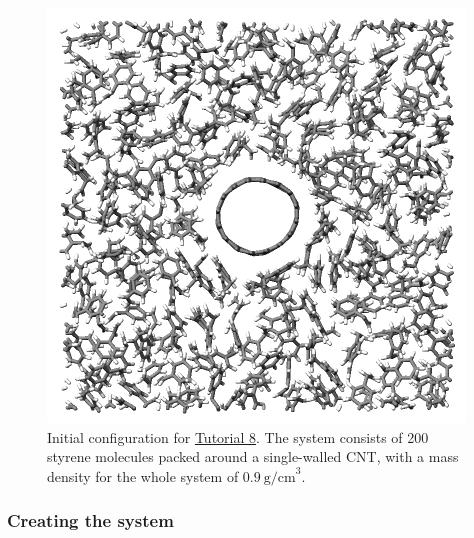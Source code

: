\documentclass[9pt,tutorial]{livecoms}
\begin{document}
\begin{figure}
\centering
\includegraphics[width=\linewidth]{REACT.png}
\caption{Initial configuration for \hyperref[bond-react-label]{Tutorial 8}.
The system consists of 200 styrene molecules packed around a single-walled
CNT, with a mass density for the whole system of $0.9~\text{g/cm}^3$.}
\label{fig:REACT}
\end{figure}

\subsubsection{Creating the system}
\end{document}
